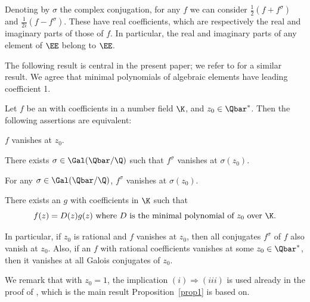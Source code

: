 \begin{Remark*}
Denoting by $\sigma $ the complex conjugation, for any \Efunction $f$ we can consider $\frac12(f+f^\sigma)$ and $\frac1{2i} (f-f^\sigma)$. These \Efunctions have real coefficients, which are respectively the real and imaginary parts of those of $f$. In particular, the real and imaginary parts of any element of $\EE$ belong to $\EE$.\end{Remark*}

The following result is central in the present paper; we refer to \cite[Prop.\,3.5]{BRS2} for a similar result. We agree that minimal polynomials of algebraic elements have leading coefficient 1.

\begin{prop}\label{prop1} Let $f$ be an \Efunction with coefficients in a number field $\K$, and $z_0\in \Qbar^\ast$. Then the following assertions are equivalent:
\begin{enumeratei}
\item\label{prop1i}
$f$ vanishes at $ z_0 $.
\item\label{prop1ii}
There exists $\sigma \in\Gal(\Qbar/\Q)$ such that $f^\sigma $ vanishes at $ \sigma(z_0) $.
\item\label{prop1iii}
For any $\sigma \in\Gal(\Qbar/\Q)$, $f^\sigma $ vanishes at $ \sigma(z_0) $.
\item\label{prop1iv}
There exists an \Efunction $g$ with coefficients in $\K$ such that
\[
f(z) = D(z) g(z) \mbox{ where $D$ is the minimal polynomial of $z_0$ over $\K$.}
\]
\end{enumeratei}
\end{prop}

In particular, if $z_0$ is rational and $f$ vanishes at $z_0$, then all conjugates $f^\sigma$ of $f$ also vanish at $z_0$.
Also, if an \Efunction $f$ with rational coefficients vanishes at some $z_0\in \Qbar^\ast$, then it vanishes at all Galois conjugates of $z_0$.

We remark that with $z_0=1$, the implication $(i)\Rightarrow (iii)$ is used already in the proof of \cite[Prop.\,4.1]{beukers}, which is the main result Proposition~\ref{prop1} is based on.

